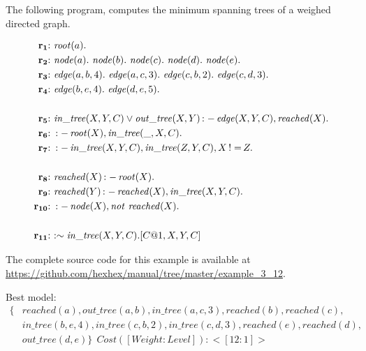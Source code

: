 \documentclass[a4paper, titlepage]{article}
\DeclareMathOperator{\leftimpl}{:-}
\DeclareMathOperator{\nott}{\mathit{not}}
\DeclareMathOperator{\noteq}{!=}
\newcommand{\examplelink}[1]{\url{https://github.com/hexhex/manual/tree/master/#1}}
\newcommand{\rowprefix}[1]{%
  \ensuremath{\color{black}\mathbf{#1{:}}\ }%
}
\begin{document}
The following program, computes the minimum spanning trees 
of a weighed directed graph.
\begin{exmp}
\begin{align*}
\rowprefix{r_1}& \mathit{root}(a). \\
\rowprefix{r_2}& \mathit{node}(a). \ \mathit{node}(b). \ 
\mathit{node}(c). \ \mathit{node}(d). \ \mathit{node}(e). \ \\
\rowprefix{r_3}& \mathit{edge}(a,b,4). \ \mathit{edge}(a,c,3). \ 
\mathit{edge}(c,b,2). \ \mathit{edge}(c,d,3). \ \\
\rowprefix{r_4}& \mathit{edge}(b,e,4). \ \mathit{edge}(d,e,5). \ \\
\\
\rowprefix{r_5} & \mathit{in\_tree}(X,Y,C) \vee 
\mathit{out\_tree}(X,Y) \leftimpl \mathit{edge}(X,Y,C), 
\mathit{reached}(X). \\
\rowprefix{r_6}& \leftimpl \mathit{root}(X), \mathit{in\_tree}
(\_,X,C).\\
\rowprefix{r_7}& \leftimpl \mathit{in\_tree}(X,Y,C), 
\mathit{in\_tree}(Z,Y,C), X \noteq Z. \\
\\
\rowprefix{r_8}& \mathit{reached}(X) \leftimpl \mathit{root}
(X). \\
\rowprefix{r_9}& \mathit{reached}(Y) \leftimpl 
\mathit{reached}(X), \mathit{in\_tree}(X,Y,C). \\
\rowprefix{r_{10}}& \leftimpl \mathit{node}(X), \nott \thinspace 
\mathit{reached}(X). \\
\\
\rowprefix{r_{11}}&\mathit{ : \sim in\_tree}(X,Y,C). [C@1,X,Y,C]
\end{align*}
\end{exmp}
The complete source code for this example is available at \examplelink{example_3_12}.

Best model:
\begin{align*}
\{ & \mathit{reached(a), out\_tree(a,b), 
   in\_tree(a,c,3), reached(b), reached(c),}\\ 
   & \mathit{in\_tree(b,e,4), in\_tree(c,b,2), in\_tree(c,d,3), 
   reached(e), reached(d),}\\ 
   &\mathit{  out\_tree(d,e)\}} \ \ Cost ([Weight:Level]): <[12:1]>
\end{align*}
\end{document}
